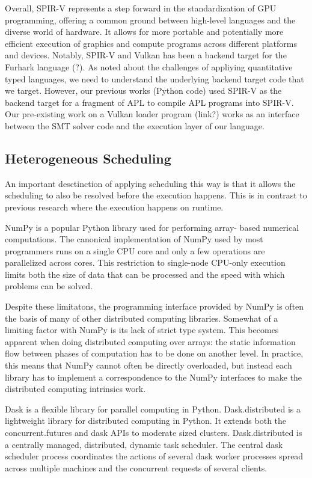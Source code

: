 \documentclass[10pt,a4paper]{article}
\begin{document}
Overall, SPIR-V represents a step forward in the standardization of GPU programming, offering a common ground between high-level languages and the diverse world of hardware. It allows for more portable and potentially more efficient execution of graphics and compute programs across different platforms and devices.
Notably, SPIR-V and Vulkan has been a backend target for the Furhark language (?).
As noted about the challenges of appliying quantitative typed languages, we need to understand the underlying backend target code that we target.
However, our previous works (Python code) used SPIR-V as the backend target for a fragment of APL to compile APL programs into SPIR-V.
Our pre-existing work on a Vulkan loader program (link?) works as an interface between the SMT solver code and the execution layer of our language.


\subsection{Heterogeneous Scheduling}

An important desctinction of applying scheduling this way is that it allows the scheduling to also be resolved before the execution happens.
This is in contrast to previous research where the execution happens on runtime.

NumPy is a popular Python library used for performing array- based numerical computations. The canonical implementation of NumPy used by most programmers runs on a single CPU core and only a few operations are parallelized across cores. This restriction to single-node CPU-only execution limits both the size of data that can be processed and the speed with which problems can be solved.

Despite these limitatons, the programming interface provided by NumPy is often the basis of many of other distributed computing libraries. Somewhat of a limiting factor with NumPy is its lack of strict type system. This becomes apparent when doing distributed computing over arrays: the static information flow between phases of computation has to be done on another level. In practice, this means that NumPy cannot often be directly overloaded, but instead each library has to implement a correspondence to the NumPy interfaces to make the distributed computing intrinsics work.

Dask is a flexible library for parallel computing in Python. Dask.distributed is a lightweight library for distributed computing in Python. It extends both the concurrent.futures and dask APIs to moderate sized clusters. Dask.distributed is a centrally managed, distributed, dynamic task scheduler. The central dask scheduler process coordinates the actions of several dask worker processes spread across multiple machines and the concurrent requests of several clients.
\end{document}
